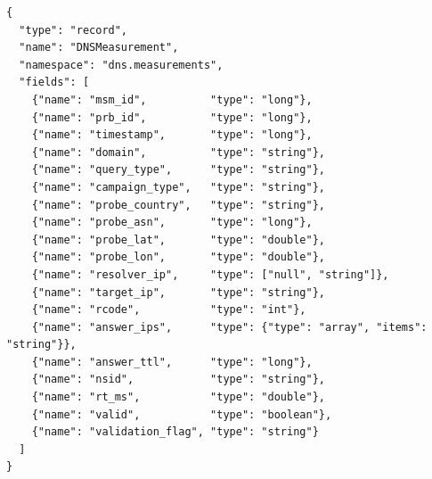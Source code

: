 \documentclass[a4paper,11pt]{book}
\begin{document}
\begin{lstlisting}[caption=Schéma Avro pour les résultats DNS (champs principaux)]
{
  "type": "record",
  "name": "DNSMeasurement",
  "namespace": "dns.measurements",
  "fields": [
    {"name": "msm_id",          "type": "long"},
    {"name": "prb_id",          "type": "long"},
    {"name": "timestamp",       "type": "long"},
    {"name": "domain",          "type": "string"},
    {"name": "query_type",      "type": "string"},
    {"name": "campaign_type",   "type": "string"},
    {"name": "probe_country",   "type": "string"},
    {"name": "probe_asn",       "type": "long"},
    {"name": "probe_lat",       "type": "double"},
    {"name": "probe_lon",       "type": "double"},
    {"name": "resolver_ip",     "type": ["null", "string"]},
    {"name": "target_ip",       "type": "string"},
    {"name": "rcode",           "type": "int"},
    {"name": "answer_ips",      "type": {"type": "array", "items": "string"}},
    {"name": "answer_ttl",      "type": "long"},
    {"name": "nsid",            "type": "string"},
    {"name": "rt_ms",           "type": "double"},
    {"name": "valid",           "type": "boolean"},
    {"name": "validation_flag", "type": "string"}
  ]
}
\end{lstlisting}
\end{document}
